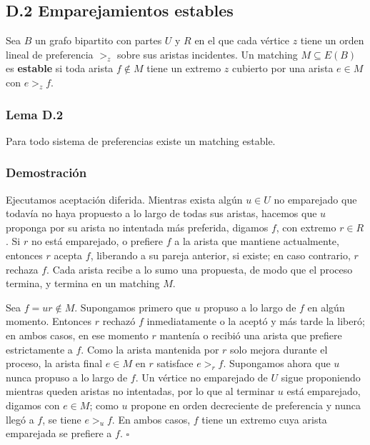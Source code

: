 \documentclass[
  11pt,
]{article}
\begin{document}
\subsection{D.2 Emparejamientos
estables}\label{d.2-emparejamientos-estables}

Sea \(B\) un grafo bipartito con partes \(U\) y \(R\) en el que cada
vértice \(z\) tiene un orden lineal de preferencia \(>_z\) sobre sus
aristas incidentes. Un matching \(M\subseteq E(B)\) es \textbf{estable}
si toda arista \(f\notin M\) tiene un extremo \(z\) cubierto por una
arista \(e\in M\) con \(e>_zf\).

\subsubsection{Lema D.2}\label{lema-d.2-galeshapley-13}

Para todo sistema de preferencias existe un matching estable.

\subsubsection{Demostración}\label{demostraciuxf3n-8}

Ejecutamos aceptación diferida. Mientras exista algún \(u\in U\) no
emparejado que todavía no haya propuesto a lo largo de todas sus
aristas, hacemos que \(u\) proponga por su arista no intentada más
preferida, digamos \(f\), con extremo \(r\in R\). Si \(r\) no está
emparejado, o prefiere \(f\) a la arista que mantiene actualmente,
entonces \(r\) acepta \(f\), liberando a su pareja anterior, si existe;
en caso contrario, \(r\) rechaza \(f\). Cada arista recibe a lo sumo una
propuesta, de modo que el proceso termina, y termina en un matching
\(M\).

Sea \(f=ur\notin M\). Supongamos primero que \(u\) propuso a lo largo de
\(f\) en algún momento. Entonces \(r\) rechazó \(f\) inmediatamente o la
aceptó y más tarde la liberó; en ambos casos, en ese momento \(r\)
mantenía o recibió una arista que prefiere estrictamente a \(f\). Como
la arista mantenida por \(r\) solo mejora durante el proceso, la arista
final \(e\in M\) en \(r\) satisface \(e>_rf\). Supongamos ahora que
\(u\) nunca propuso a lo largo de \(f\). Un vértice no emparejado de
\(U\) sigue proponiendo mientras queden aristas no intentadas, por lo
que al terminar \(u\) está emparejado, digamos con \(e\in M\); como
\(u\) propone en orden decreciente de preferencia y nunca llegó a \(f\),
se tiene \(e>_uf\). En ambos casos, \(f\) tiene un extremo cuya arista
emparejada se prefiere a \(f\). \(\square\)
\end{document}
